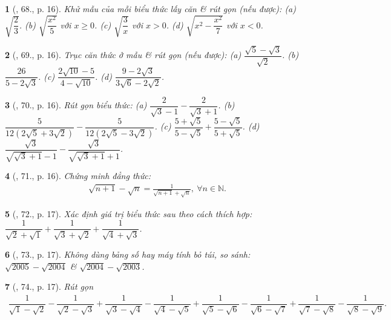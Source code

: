 \documentclass{article}
\newtheorem{baitoan}{}%
\begin{document}
\begin{baitoan}[\cite{SBT_Toan_9_tap_1}, 68., p. 16]
	Khử mẫu của mỗi biểu thức lấy căn \& rút gọn (nếu được): (a) $\sqrt{\dfrac{2}{3}}$. (b) $\sqrt{\dfrac{x^2}{5}}$ với $x\ge0$. (c) $\sqrt{\dfrac{3}{x}}$ với $x > 0$. (d) $\sqrt{x^2 - \dfrac{x^2}{7}}$ với $x < 0$.
\end{baitoan}

\begin{baitoan}[\cite{SBT_Toan_9_tap_1}, 69., p. 16]
	Trục căn thức ở mẫu \& rút gọn (nếu được): (a) $\dfrac{\sqrt{5} - \sqrt{3}}{\sqrt{2}}$. (b) $\dfrac{26}{5 - 2\sqrt{3}}$. (c) $\dfrac{2\sqrt{10} - 5}{4 - \sqrt{10}}$. (d) $\dfrac{9 - 2\sqrt{3}}{3\sqrt{6} - 2\sqrt{2}}$.
\end{baitoan}

\begin{baitoan}[\cite{SBT_Toan_9_tap_1}, 70., p. 16]
	Rút gọn biểu thức: (a) $\dfrac{2}{\sqrt{3} - 1} - \dfrac{2}{\sqrt{3} + 1}$. (b) $\dfrac{5}{12(2\sqrt{5} + 3\sqrt{2})} - \dfrac{5}{12(2\sqrt{5} - 3\sqrt{2})}$. (c) $\dfrac{5 + \sqrt{5}}{5 - \sqrt{5}} + \dfrac{5 - \sqrt{5}}{5 + \sqrt{5}}$. (d) $\dfrac{\sqrt{3}}{\sqrt{\sqrt{3} + 1} - 1} - \dfrac{\sqrt{3}}{\sqrt{\sqrt{3} + 1} + 1}$.
\end{baitoan}

\begin{baitoan}[\cite{SBT_Toan_9_tap_1}, 71., p. 16]
	Chứng minh đẳng thức:
	\begin{align*}
		\sqrt{n + 1} - \sqrt{n} = \frac{1}{\sqrt{n + 1} + \sqrt{n}},\ \forall n\in\mathbb{N}.
	\end{align*}
\end{baitoan}

\begin{baitoan}[\cite{SBT_Toan_9_tap_1}, 72., p. 17]
	Xác định giá trị biểu thức sau theo cách thích hợp: $\dfrac{1}{\sqrt{2} + \sqrt{1}} + \dfrac{1}{\sqrt{3} + \sqrt{2}} + \dfrac{1}{\sqrt{4} + \sqrt{3}}$.
\end{baitoan}

\begin{baitoan}[\cite{SBT_Toan_9_tap_1}, 73., p. 17]
	Không dùng bảng số hay máy tính bỏ túi, so sánh: $\sqrt{2005} - \sqrt{2004}$ \& $\sqrt{2004} - \sqrt{2003}$.
\end{baitoan}

\begin{baitoan}[\cite{SBT_Toan_9_tap_1}, 74., p. 17]
	Rút gọn
	\begin{align*}
		\dfrac{1}{\sqrt{1} - \sqrt{2}} - \dfrac{1}{\sqrt{2} - \sqrt{3}} + \dfrac{1}{\sqrt{3} - \sqrt{4}} - \dfrac{1}{\sqrt{4} - \sqrt{5}} + \dfrac{1}{\sqrt{5} - \sqrt{6}} - \dfrac{1}{\sqrt{6} - \sqrt{7}} + \dfrac{1}{\sqrt{7} - \sqrt{8}} - \dfrac{1}{\sqrt{8} - \sqrt{9}}.
	\end{align*}
\end{baitoan}
\end{document}
